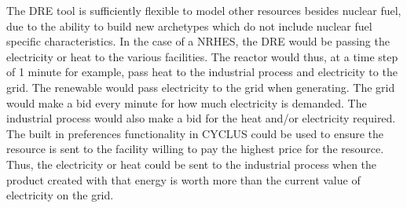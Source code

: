 \documentclass[12pt]{UIdahoMastersThesis}
\begin{document}
The DRE tool is sufficiently flexible to model other resources besides nuclear fuel, due to the ability to build new archetypes which do not include nuclear fuel specific characteristics.  In the case of a NRHES, the DRE would be passing the electricity or heat to the various facilities.  The reactor would thus, at a time step of 1 minute for example, pass heat to the industrial process and electricity to the grid.  The renewable would pass electricity to the grid when generating.  The grid would make a bid every minute for how much electricity is demanded.  The industrial process would also make a bid for the heat and/or electricity required.  The built in preferences functionality in CYCLUS could be used to ensure the resource is sent to the facility willing to pay the highest price for the resource.  Thus, the electricity or heat could be sent to the industrial process when the product created with that energy is worth more than the current value of electricity on the grid.
%
%


\end{document}

